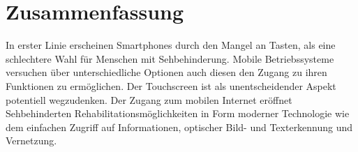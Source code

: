 \section{Zusammenfassung}

In erster Linie erscheinen Smartphones durch den Mangel an Tasten, als eine schlechtere Wahl für Menschen mit Sehbehinderung. Mobile Betriebssysteme versuchen über unterschiedliche Optionen auch diesen den Zugang zu ihren Funktionen zu ermöglichen. Der Touchscreen ist als unentscheidender Aspekt potentiell wegzudenken. Der Zugang zum mobilen Internet eröffnet Sehbehinderten Rehabilitationsmöglichkeiten in Form moderner Technologie wie dem einfachen Zugriff auf Informationen, optischer Bild- und Texterkennung und Vernetzung. 
